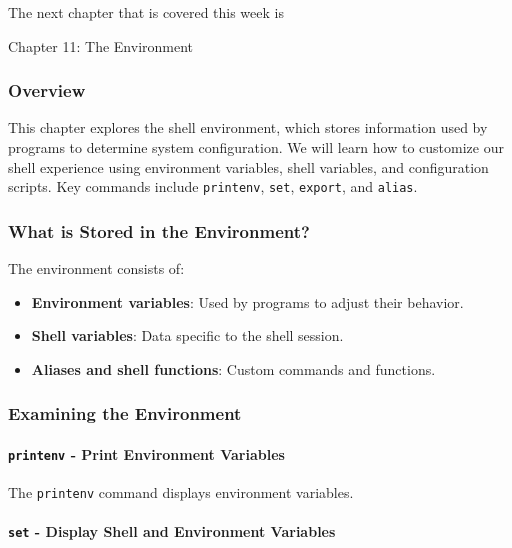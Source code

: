 The next chapter that is covered this week is \textbf{}

\begin{notes}{Chapter 11: The Environment}
    \subsubsection*{Overview}

    This chapter explores the shell environment, which stores information used by programs to determine system configuration. We will learn how to customize our shell experience using environment 
    variables, shell variables, and configuration scripts. Key commands include \texttt{printenv}, \texttt{set}, \texttt{export}, and \texttt{alias}.

    \subsubsection*{What is Stored in the Environment?}

    The environment consists of:
    \begin{itemize}
        \item \textbf{Environment variables}: Used by programs to adjust their behavior.
        \item \textbf{Shell variables}: Data specific to the shell session.
        \item \textbf{Aliases and shell functions}: Custom commands and functions.
    \end{itemize}

    \subsubsection*{Examining the Environment}

    \paragraph*{\texttt{printenv} - Print Environment Variables}

    The \texttt{printenv} command displays environment variables.
    \begin{highlight}
    \end{highlight}

    \paragraph*{\texttt{set} - Display Shell and Environment Variables}


\end{notes}
